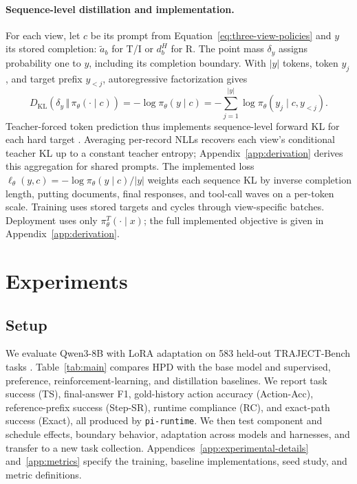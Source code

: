 \documentclass{article}
\begin{document}
\paragraph{Sequence-level distillation and implementation.}
For each view, let $c$ be its prompt from
Equation~\ref{eq:three-view-policies} and $y$ its stored completion:
$\tilde a_b$ for T/I or $d_b^H$ for R. The point mass $\delta_y$ assigns
probability one to $y$, including its completion boundary. With $|y|$ tokens,
token $y_j$, and target prefix $y_{<j}$, autoregressive factorization gives
\begin{equation}
D_{\mathrm{KL}}\!\left(\delta_y\,\Vert\,\pi_\theta(\cdot\mid c)\right)
=-\log\pi_\theta(y\mid c)
=-\sum_{j=1}^{|y|}\log\pi_\theta(y_j\mid c,y_{<j}).
\label{eq:hard-target-kl}
\end{equation}
Teacher-forced token prediction thus implements sequence-level forward KL
for each hard target \citep{kim2016sequence}. Averaging per-record NLLs
recovers each view's conditional teacher KL up to a constant teacher entropy;
Appendix~\ref{app:derivation} derives this aggregation for shared prompts.
The implemented loss $\ell_\theta(y,c)=-\log\pi_\theta(y\mid c)/|y|$
weights each sequence KL by inverse completion length, putting documents,
final responses, and tool-call waves on a per-token scale.
Training uses stored targets and cycles through view-specific batches. Deployment uses only $\pi_\theta^T(\cdot\mid x)$;
the full implemented objective is given in Appendix~\ref{app:derivation}.

\section{Experiments}
\label{sec:experiments}

\begingroup
\setlength{\textfloatsep}{9pt plus 2pt minus 2pt}
\setlength{\floatsep}{8pt plus 2pt minus 2pt}
\setlength{\intextsep}{7pt plus 2pt minus 2pt}
\setlength{\abovecaptionskip}{4pt}
\setlength{\belowcaptionskip}{0pt}

\subsection{Setup}

We evaluate Qwen3-8B \citep{yang2025qwen3} with LoRA adaptation
\citep{hu2022lora} on 583 held-out TRAJECT-Bench tasks
\citep{he2026trajectbench}. Table~\ref{tab:main} compares HPD with the base
model and supervised, preference, reinforcement-learning, and distillation
baselines. We report task success (TS), final-answer F1, gold-history action
accuracy (Action-Acc), reference-prefix success (Step-SR), runtime compliance
(RC), and exact-path success (Exact), all produced by \texttt{pi-runtime}.
We then test component and schedule effects, boundary behavior, adaptation
across models and harnesses, and transfer to a new task collection.
Appendices~\ref{app:experimental-details} and~\ref{app:metrics} specify the
training, baseline implementations, seed study, and metric definitions.
\end{document}
